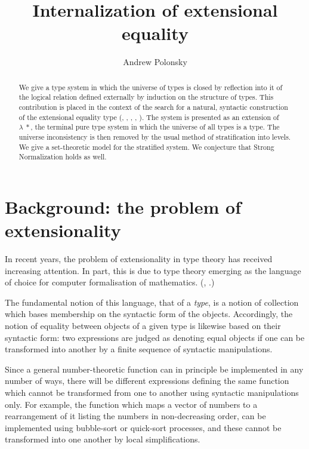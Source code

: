 \documentclass[10pt]{article}
\title{Internalization of extensional equality}
\author{Andrew Polonsky}
\newcommand{\sta}{*}
\newcommand{\lstar}{{\lambda\!\!\:\sta}}
\begin{document}
\maketitle

\begin{abstract}
We give a type system in which the universe of types is closed by
reflection into it of the logical relation defined
externally by induction on the
structure of types.
This contribution is placed in the context of the search for a
natural, syntactic construction of the extensional equality type
(\cite{tait}, \cite{thorsten1999}, \cite{coquand}, \cite{harper}, \cite{perML}).
The system is presented as an extension of $\lstar$, the terminal pure
type system in which the universe of all types is a type.
The universe inconsistency is then removed by the usual method of
stratification into levels.
We give a set-theoretic model for the stratified
system.  We conjecture that Strong Normalization holds as well.
\end{abstract}

\section{Background: the problem of extensionality}

In recent years, the problem of extensionality in type theory has
received increasing attention.  In part, this is due to
type theory emerging as the language of choice for
computer formalisation of mathematics.
(\cite{Gonthier},  \cite{thehomotopybook}.)

The fundamental notion of this language, that of a \emph{type},
is a notion of collection which bases membership on the
syntactic form of the objects.  Accordingly, the notion of
equality between objects of a given type is likewise based
on their syntactic form:
two expressions are judged as denoting equal objects
if one can be transformed into another by a finite
sequence of syntactic manipulations.

Since a general number-theoretic function can in principle be
implemented in any number of ways, there will be
different expressions defining the same function which cannot
be transformed from one to another using syntactic manipulations only.
For example, the function which maps a vector of numbers
to a rearrangement of it listing the numbers in non-decreasing order,
can be implemented using bubble-sort or quick-sort processes,
and these cannot be transformed into one another by local
simplifications.
\end{document}
